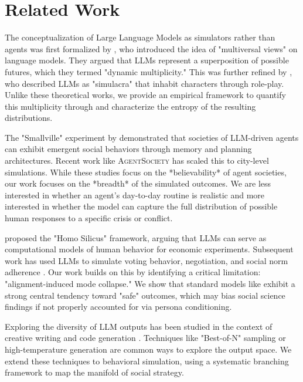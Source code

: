 \section{Related Work}
\label{sec:related}

 The conceptualization of Large Language Models as simulators rather than agents was first formalized by \citet{reynolds2021multiversal}, who introduced the idea of "multiversal views" on language models. They argued that LLMs represent a superposition of possible futures, which they termed "dynamic multiplicity." This was further refined by \citet{shanahan2023roleplay}, who described LLMs as "simulacra" that inhabit characters through role-play. Unlike these theoretical works, we provide an empirical framework to quantify this multiplicity through \method and characterize the entropy of the resulting distributions.

 The "Smallville" experiment by \citet{park2023generative} demonstrated that societies of LLM-driven agents can exhibit emergent social behaviors through memory and planning architectures. Recent work like \textsc{AgentSociety} \cite{piao2025agentsociety} has scaled this to city-level simulations. While these studies focus on the *believability* of agent societies, our work focuses on the *breadth* of the simulated outcomes. We are less interested in whether an agent's day-to-day routine is realistic and more interested in whether the model can capture the full distribution of possible human responses to a specific crisis or conflict.

 \citet{horton2023homo} proposed the "Homo Silicus" framework, arguing that LLMs can serve as computational models of human behavior for economic experiments. Subsequent work has used LLMs to simulate voting behavior, negotiation, and social norm adherence \cite{argyle2023out, chwang2023simulating}. Our work builds on this by identifying a critical limitation: "alignment-induced mode collapse." We show that standard models like \gpt exhibit a strong central tendency toward "safe" outcomes, which may bias social science findings if not properly accounted for via persona conditioning.

 Exploring the diversity of LLM outputs has been studied in the context of creative writing and code generation \cite{wang2022self, li2022competition}. Techniques like "Best-of-N" sampling or high-temperature generation are common ways to explore the output space. We extend these techniques to behavioral simulation, using a systematic branching framework to map the manifold of social strategy.
